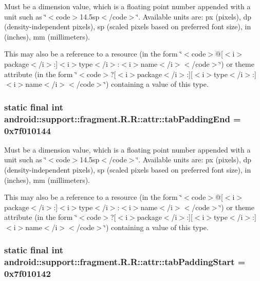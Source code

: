 Must be a dimension value, which is a floating point number appended with a unit such as \char`\"{}$<$code$>$14.5sp$<$/code$>$\char`\"{}. Available units are: px (pixels), dp (density-independent pixels), sp (scaled pixels based on preferred font size), in (inches), mm (millimeters). 

This may also be a reference to a resource (in the form \char`\"{}$<$code$>$@\mbox{[}$<$i$>$package$<$/i$>$:\mbox{]}$<$i$>$type$<$/i$>$:$<$i$>$name$<$/i$>$$<$/code$>$\char`\"{}) or theme attribute (in the form \char`\"{}$<$code$>$?\mbox{[}$<$i$>$package$<$/i$>$:\mbox{]}\mbox{[}$<$i$>$type$<$/i$>$:\mbox{]}$<$i$>$name$<$/i$>$$<$/code$>$\char`\"{}) containing a value of this type. \hypertarget{classandroid_1_1support_1_1fragment_1_1_r_1_1attr_edc09cafcb03bc0869b7fc6b087ac649}{
\subsubsection[{tabPaddingEnd}]{\setlength{\rightskip}{0pt plus 5cm}static final int android::support::fragment.R.R::attr::tabPaddingEnd = 0x7f010144}}
\label{classandroid_1_1support_1_1fragment_1_1_r_1_1attr_edc09cafcb03bc0869b7fc6b087ac649}


Must be a dimension value, which is a floating point number appended with a unit such as \char`\"{}$<$code$>$14.5sp$<$/code$>$\char`\"{}. Available units are: px (pixels), dp (density-independent pixels), sp (scaled pixels based on preferred font size), in (inches), mm (millimeters). 

This may also be a reference to a resource (in the form \char`\"{}$<$code$>$@\mbox{[}$<$i$>$package$<$/i$>$:\mbox{]}$<$i$>$type$<$/i$>$:$<$i$>$name$<$/i$>$$<$/code$>$\char`\"{}) or theme attribute (in the form \char`\"{}$<$code$>$?\mbox{[}$<$i$>$package$<$/i$>$:\mbox{]}\mbox{[}$<$i$>$type$<$/i$>$:\mbox{]}$<$i$>$name$<$/i$>$$<$/code$>$\char`\"{}) containing a value of this type. \hypertarget{classandroid_1_1support_1_1fragment_1_1_r_1_1attr_21732f8b14ac1d7a0867d987e7453896}{
\subsubsection[{tabPaddingStart}]{\setlength{\rightskip}{0pt plus 5cm}static final int android::support::fragment.R.R::attr::tabPaddingStart = 0x7f010142}}
\label{classandroid_1_1support_1_1fragment_1_1_r_1_1attr_21732f8b14ac1d7a0867d987e7453896}



